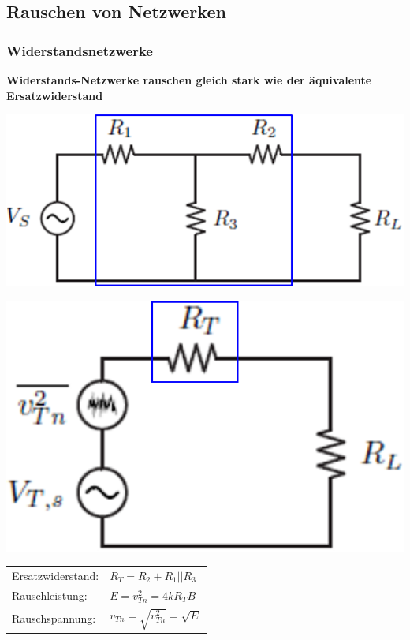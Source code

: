 \subsection{Rauschen von Netzwerken}

\subsubsection{Widerstandsnetzwerke}

\textbf{Widerstands-Netzwerke rauschen gleich stark wie der äquivalente Ersatzwiderstand} 


\begin{minipage}[c]{0.28\columnwidth}
    \includegraphics[width=\columnwidth]{images/gesamte_rauschspannung_schaltung.png}
\end{minipage}
\hfill
\begin{minipage}[c]{0.22\columnwidth}
    \includegraphics[width=\columnwidth]{images/gesamte_rauschspannung_ersatzschaltung.png}
\end{minipage}
\hfill
\begin{minipage}[c]{0.48\columnwidth}
    \renewcommand{\arraystretch}{1.4}
    \begin{tabular}{ll@{}}
        Ersatzwiderstand:   & $R_T = R_2 + R_1 || R_3$              \\
        Rauschleistung:     & $E = v^2_{Tn} = 4 k R_T B $           \\
        Rauschspannung:     & $v_{Tn} = \sqrt{v^2_{Tn}} = \sqrt{E}$ \\
    \end{tabular}
    \renewcommand{\arraystretch}{1}
\end{minipage}


